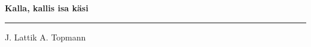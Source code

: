 \documentclass[10pt]{book}
\begin{document}
{
  \samepage
  \raggedbottom
  \raggedright
  \sloppy


  \vspace{0.2in}

  \noindent\begin{minipage}{.1\textwidth}
    \hfill\vspace{0.1in}
  \end{minipage}%
  \noindent\begin{minipage}{.8\textwidth}
    \centering
    \bfseries
    \large Kalla, kallis isa k\"asi
  \end{minipage}%
  \noindent\begin{minipage}{.1\textwidth}
      \hfill\vspace{0.1in}
  \end{minipage}

  \nopagebreak[4]
  \vspace{0.1in}
  \nopagebreak[4]
  \hrule height 0.05ex
  \nopagebreak[4]
  \vspace{-0.05in}

  {\footnotesize J. Lattik \hfill A. Topmann }\\
  \vspace{0.01in}



}
\end{document}
